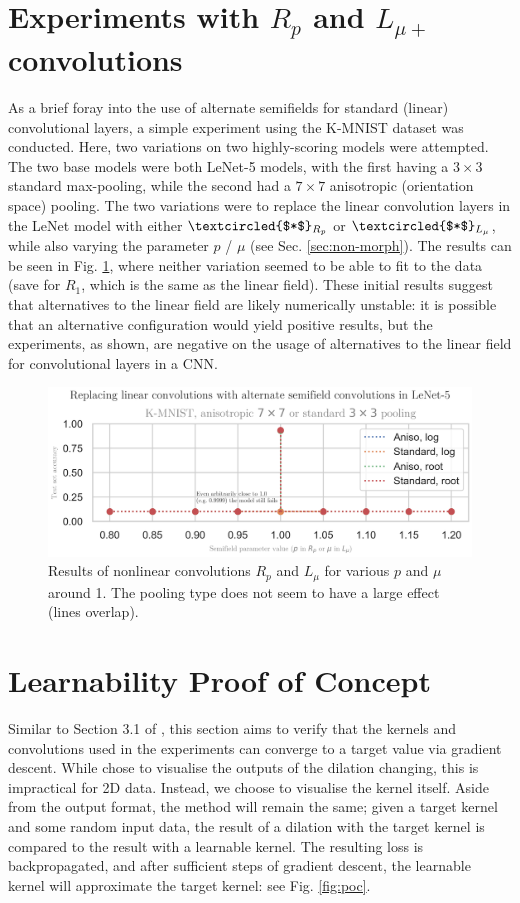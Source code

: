 \documentclass[a4paper, 12pt]{report}
\begin{document}
\newpage
\section{Experiments with $R_p$ and $L_{\mu+}$ convolutions }
\label{sec:nonlinconv}
As a brief foray into the use of alternate semifields for standard (linear) convolutional layers, a simple experiment using the K-MNIST dataset was conducted. Here, two variations on two highly-scoring models were attempted. The two base models were both LeNet-5 models, with the first having a $3\times3$ standard max-pooling, while the second had a $7\times7$ anisotropic (orientation space) pooling. The two variations were to replace the linear convolution layers in the LeNet model with either $\textcircled{$*$}_{R_p}$ or $\textcircled{$*$}_{L_\mu}$, while also varying the parameter $p$ / $\mu$ (see Sec. \ref{sec:non-morph}).
The results can be seen in Fig. \ref{fig:nonlinconv}, where neither variation seemed to be able to fit to the data (save for $R_1$, which is the same as the linear field). These initial results suggest that alternatives to the linear field are likely numerically unstable: it is possible that an alternative configuration would yield positive results, but the experiments, as shown, are negative on the usage of alternatives to the linear field for convolutional layers in a CNN.

\begin{figure}[h!]
	\center
  \includegraphics[width=\textwidth]{figures/results_nonlin.png}
  \caption{Results of nonlinear convolutions $R_p$ and $L_\mu$ for various $p$ and $\mu$ around 1. The pooling type does not seem to have a large effect (lines overlap).}
  \label{fig:nonlinconv}
\end{figure}
\vspace{-0.8cm}
\section{Learnability Proof of Concept}
\label{sec:poc}
Similar to Section 3.1 of \cite{thierrybsc}, this section aims to verify that the kernels and convolutions used in the experiments can converge to a target value via gradient descent. While \cite{thierrybsc} chose to visualise the outputs of the dilation changing, this is impractical for 2D data. Instead, we choose to visualise the kernel itself. Aside from the output format, the method will remain the same; given a target kernel and some random input data, the result of a dilation with the target kernel is compared to the result with a learnable kernel. The resulting loss is backpropagated, and after sufficient steps of gradient descent, the learnable kernel will approximate the target kernel: see Fig. \ref{fig:poc}.
\end{document}
